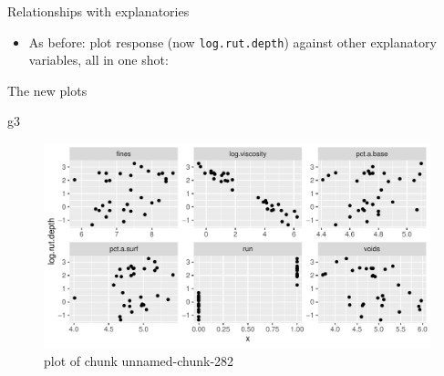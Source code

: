 \documentclass[ignorenonframetext,]{beamer}
\newenvironment{Shaded}{\begin{snugshade}}{\end{snugshade}}
\newcommand{\DataTypeTok}[1]{\textcolor[rgb]{0.13,0.29,0.53}{#1}}
\newcommand{\DecValTok}[1]{\textcolor[rgb]{0.00,0.00,0.81}{#1}}
\newcommand{\KeywordTok}[1]{\textcolor[rgb]{0.13,0.29,0.53}{\textbf{#1}}}
\newcommand{\NormalTok}[1]{#1}
\newcommand{\OperatorTok}[1]{\textcolor[rgb]{0.81,0.36,0.00}{\textbf{#1}}}
\newcommand{\StringTok}[1]{\textcolor[rgb]{0.31,0.60,0.02}{#1}}
\providecommand{\tightlist}{%
  \setlength{\itemsep}{0pt}\setlength{\parskip}{0pt}}
\begin{document}
\begin{frame}[fragile]{Relationships with explanatories}
\protect\hypertarget{relationships-with-explanatories}{}

\begin{itemize}
\tightlist
\item
  As before: plot response (now \texttt{log.rut.depth}) against other
  explanatory variables, all in one shot:
\end{itemize}

\begin{Shaded}
\end{Shaded}

\end{frame}

\begin{frame}[fragile]{The new plots}
\protect\hypertarget{the-new-plots}{}

\begin{Shaded}
\begin{Highlighting}[]
\NormalTok{g3}
\end{Highlighting}
\end{Shaded}

\begin{figure}
\centering
\includegraphics{figure/unnamed-chunk-282-1.pdf}
\caption{plot of chunk unnamed-chunk-282}
\end{figure}

\end{frame}
\end{document}
